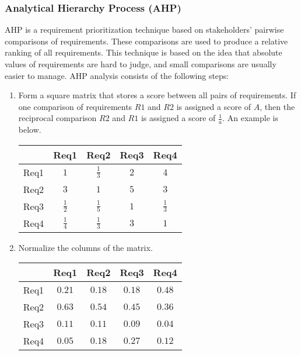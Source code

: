 \documentclass[12pt,titlepage]{article}
\begin{document}
      \subsubsection{Analytical Hierarchy Process (AHP)}
        AHP is a requirement prioritization technique based on stakeholders' pairwise comparisons of requirements. These comparisons are used to produce a relative
        ranking of all requirements. This technique is based on the idea that absolute values of requirements are hard to judge, and small comparisons are usually
        easier to manage. AHP analysis consists of the following steps:

        \begin{enumerate}
          \item
            Form a square matrix that stores a score between all pairs of requirements. If one comparison of requirements $R1$ and $R2$ is assigned a score of
            $A$, then the reciprocal comparison $R2$ and $R1$ is assigned a score of $\frac{1}{a}$. An example is below.
            \begin{center}
              \begin{tabular}{ |c|c|c|c|c| } 
                \hline
                     & Req1 & Req2 & Req3 & Req4 \\ 
                \hline
                Req1 & $1$ & $\frac{1}{3}$ & $2$ & $4$ \\ 
                \hline
                Req2 & $3$ & $1$ & $5$ & $3$ \\ 
                \hline
                Req3 & $\frac{1}{2}$ & $\frac{1}{5}$ & $1$ & $\frac{1}{3}$ \\ 
                \hline
                Req4 & $\frac{1}{4}$ & $\frac{1}{3}$ & $3$ & $1$ \\ 
                \hline
              \end{tabular}
            \end{center}

          \item Normalize the columns of the matrix.
            \begin{center}
              \begin{tabular}{ |c|c|c|c|c| } 
                \hline
                     & Req1 & Req2 & Req3 & Req4 \\ 
                \hline
                Req1 & $0.21$ & $0.18$ & $0.18$ & $0.48$ \\ 
                \hline
                Req2 & $0.63$ & $0.54$ & $0.45$ & $0.36$ \\ 
                \hline
                Req3 & $0.11$ & $0.11$ & $0.09$ & $0.04$ \\ 
                \hline
                Req4 & $0.05$ & $0.18$ & $0.27$ & $0.12$ \\ 
                \hline
              \end{tabular}
            \end{center}


\end{enumerate}
\end{document}
